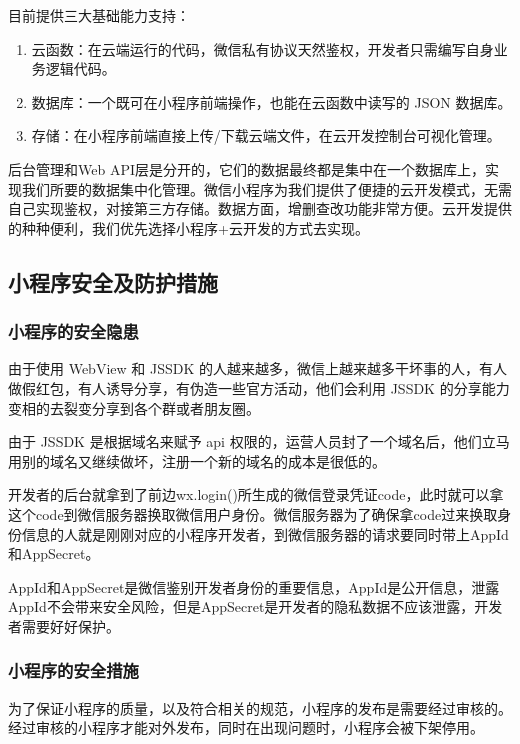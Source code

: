 \documentclass[UTF8,12pt]{ctexart}
\numberwithin{figure}{section}%
\begin{document}
\begin{spacing}{2}
目前提供三大基础能力支持：
\begin{enumerate}
	\item 云函数：在云端运行的代码，微信私有协议天然鉴权，开发者只需编写自身业务逻辑代码。
	
	\item 数据库：一个既可在小程序前端操作，也能在云函数中读写的 JSON 数据库。
	
	\item 存储：在小程序前端直接上传/下载云端文件，在云开发控制台可视化管理。
	
\end{enumerate}

后台管理和Web API层是分开的，它们的数据最终都是集中在一个数据库上，实现我们所要的数据集中化管理。微信小程序为我们提供了便捷的云开发模式，无需自己实现鉴权，对接第三方存储。数据方面，增删查改功能非常方便。云开发提供的种种便利，我们优先选择小程序+云开发的方式去实现。

\subsection{ 小程序安全及防护措施}
\subsubsection{ 小程序的安全隐患}

由于使用 WebView 和 JSSDK 的人越来越多，微信上越来越多干坏事的人，有人做假红包，有人诱导分享，有伪造一些官方活动，他们会利用 JSSDK 的分享能力变相的去裂变分享到各个群或者朋友圈。

由于 JSSDK 是根据域名来赋予 api 权限的，运营人员封了一个域名后，他们立马用别的域名又继续做坏，注册一个新的域名的成本是很低的。

开发者的后台就拿到了前边wx.login()所生成的微信登录凭证code，此时就可以拿这个code到微信服务器换取微信用户身份。微信服务器为了确保拿code过来换取身份信息的人就是刚刚对应的小程序开发者，到微信服务器的请求要同时带上AppId和AppSecret。

AppId和AppSecret是微信鉴别开发者身份的重要信息，AppId是公开信息，泄露AppId不会带来安全风险，但是AppSecret是开发者的隐私数据不应该泄露，开发者需要好好保护。

\subsubsection{小程序的安全措施}

为了保证小程序的质量，以及符合相关的规范，小程序的发布是需要经过审核的。经过审核的小程序才能对外发布，同时在出现问题时，小程序会被下架停用。


\end{spacing}
\end{document}
